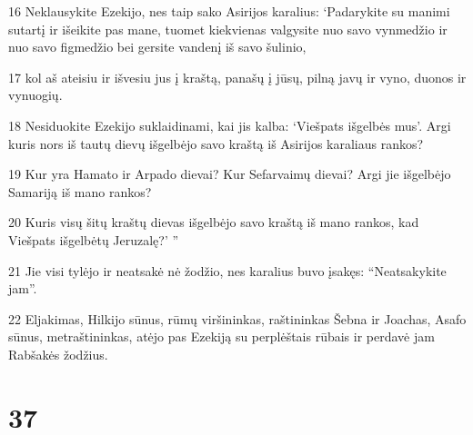 \par 16 Neklausykite Ezekijo, nes taip sako Asirijos karalius: ‘Padarykite su manimi sutartį ir išeikite pas mane, tuomet kiekvienas valgysite nuo savo vynmedžio ir nuo savo figmedžio bei gersite vandenį iš savo šulinio, 
\par 17 kol aš ateisiu ir išvesiu jus į kraštą, panašų į jūsų, pilną javų ir vyno, duonos ir vynuogių. 
\par 18 Nesiduokite Ezekijo suklaidinami, kai jis kalba: ‘Viešpats išgelbės mus’. Argi kuris nors iš tautų dievų išgelbėjo savo kraštą iš Asirijos karaliaus rankos? 
\par 19 Kur yra Hamato ir Arpado dievai? Kur Sefarvaimų dievai? Argi jie išgelbėjo Samariją iš mano rankos? 
\par 20 Kuris visų šitų kraštų dievas išgelbėjo savo kraštą iš mano rankos, kad Viešpats išgelbėtų Jeruzalę?’ ” 
\par 21 Jie visi tylėjo ir neatsakė nė žodžio, nes karalius buvo įsakęs: “Neatsakykite jam”. 
\par 22 Eljakimas, Hilkijo sūnus, rūmų viršininkas, raštininkas Šebna ir Joachas, Asafo sūnus, metraštininkas, atėjo pas Ezekiją su perplėštais rūbais ir perdavė jam Rabšakės žodžius.



\chapter{37}


